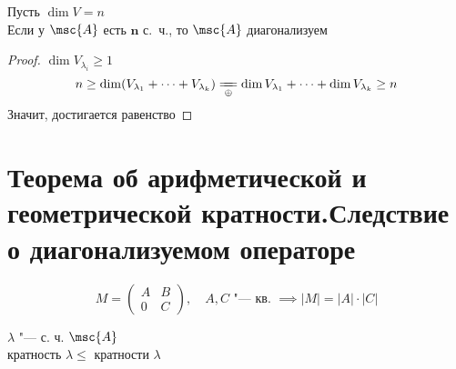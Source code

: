 \begin{implication}
	Пусть $ \dim V = n $ \\
	Если у $ \msc{A} $ есть $ \bm n $  с.~ч., то $ \msc{A} $ диагонализуем
\end{implication}

\begin{proof}
	$ \dim V_{\lambda_i} \ge 1 $
	$$ n \ge \dim(V_{\lambda_1} + \dots + V_{\lambda_k}) \undereq{\oplus} \dim V_{\lambda_1} + \dots + \dim V_{\lambda_k} \ge n $$
	Значит, достигается равенство
\end{proof}

\section{Теорема об арифметической и геометрической кратности.\n Следствие о диагонализуемом операторе}

\begin{remind}
	$$ M =
	\begin{pmatrix}
		A & B \\
		0 & C
	\end{pmatrix}, \quad A, C \text{ "--- кв. } \implies |M| = |A| \cdot |C| $$
\end{remind}

\begin{theorem}
	$ \lambda $ "--- с. ч. $ \msc{A} $ \\
	 кратность $ \lambda \bm\le $  кратности $ \lambda $
\end{theorem}

